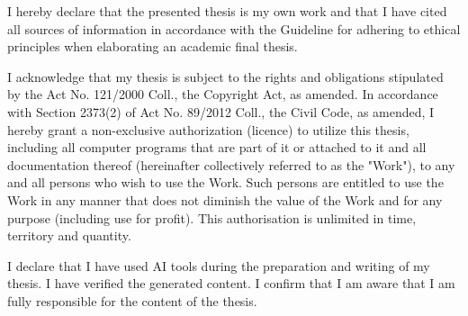 \documentclass[english,bachelor,twoside]{ctufit-thesis}
\begin{document}
    \begin{declarationpage}
        I hereby declare that the presented thesis is my own work and that I have cited all sources of
        information in accordance with the Guideline for adhering to ethical principles when elaborating an
        academic final thesis.

        I acknowledge that my thesis is subject to the rights and obligations stipulated by the Act No.
        121/2000 Coll., the Copyright Act, as amended. In accordance with Section 2373(2) of Act No.
        89/2012 Coll., the Civil Code, as amended, I hereby grant a non-exclusive authorization (licence) to
        utilize this thesis, including all computer programs that are part of it or attached to it and all
        documentation thereof (hereinafter collectively referred to as the "Work"), to any and all persons
        who wish to use the Work. Such persons are entitled to use the Work in any manner that does not
        diminish the value of the Work and for any purpose (including use for profit). This authorisation is
        unlimited in time, territory and quantity.

        I declare that I have used AI tools during the preparation and writing of my thesis. I have verified
        the generated content. I confirm that I am aware that I am fully responsible for the content of the
        thesis.
    \end{declarationpage}

    \printtwopageabstract
\end{document}
